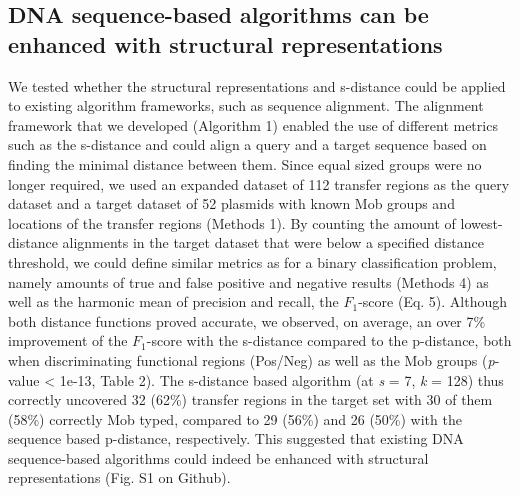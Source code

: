 \documentclass[sigconf]{acmart}
\begin{document}
\subsection{DNA sequence-based algorithms can be enhanced with structural representations}
We tested whether the structural representations and s-distance could be applied to existing algorithm frameworks, such as sequence alignment. The alignment framework that we developed (Algorithm 1) enabled the use of different metrics such as the s-distance and could align a query and a target sequence based on finding the minimal distance between them. Since equal sized groups were no longer required, we used an expanded dataset of 112 transfer regions as the query dataset and a target dataset of 52 plasmids with known Mob groups and locations of the transfer regions \cite{Zrimec2020-wx} (Methods 1). By counting the amount of lowest-distance alignments in the target dataset that were below a specified distance threshold, we could define similar metrics as for a binary classification problem, namely amounts of true and false positive and negative results (Methods 4) as well as the harmonic mean of precision and recall, the $F_1$-score (Eq. 5). Although both distance functions proved accurate, we observed, on average, an over 7\% improvement of the $F_1$-score with the s-distance compared to the p-distance, both when discriminating functional regions (Pos/Neg) as well as the Mob groups (\textit{p}-value < 1e-13, Table 2). The s-distance based algorithm (at \textit{s} = 7, \textit{k} = 128) thus correctly uncovered 32 (62\%) transfer regions in the target set with 30 of them (58\%) correctly Mob typed, compared to 29 (56\%) and 26 (50\%) with the sequence based p-distance, respectively. This suggested that existing DNA sequence-based algorithms could indeed be enhanced with structural representations \cite{Marcovitz2013-kg,Levo2015-iu,Rohs2009-hm} (Fig. S1 on Github).
\end{document}
